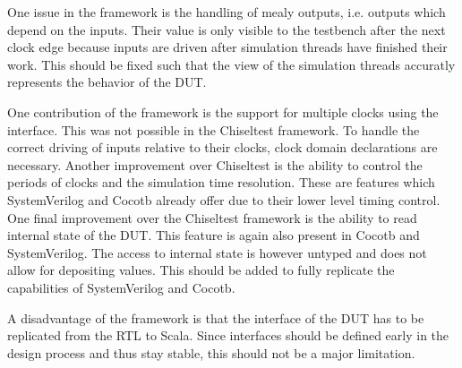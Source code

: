 One issue in the framework is the handling of mealy outputs, i.e. outputs which depend on the inputs. Their value is only visible to the testbench after the next clock edge because inputs are driven after simulation threads have finished their work. This should be fixed such that the view of the simulation threads accuratly represents the behavior of the DUT.

One contribution of the framework is the support for multiple clocks using the  interface. This was not possible in the Chiseltest framework. To handle the correct driving of inputs relative to their clocks, clock domain declarations are necessary. Another improvement over Chiseltest is the ability to control the periods of clocks and the simulation time resolution. These are features which SystemVerilog and Cocotb already offer due to their lower level timing control. One final improvement over the Chiseltest framework is the ability to read internal state of the DUT. This feature is again also present in Cocotb and SystemVerilog. The access to internal state is however untyped and does not allow for depositing values. This should be added to fully replicate the capabilities of SystemVerilog and Cocotb.

A disadvantage of the framework is that the interface of the DUT has to be replicated from the RTL to Scala. Since interfaces should be defined early in the design process and thus stay stable, this should not be a major limitation.



